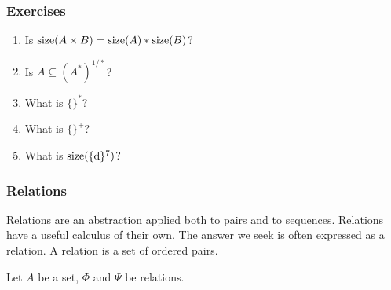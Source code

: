 \subsubsection{Exercises}

\begin{enumerate}\setcounter{enumi}{\value{RunningExercise}}

\item Is ${\rm size}(A \times B) = {\rm size}(A)*{\rm size}(B)$? 

\item Is $A \subseteq (A^*)^{1/*}$?

\item What is $\{\}^*$?

\item What is $\{\}^{\scriptscriptstyle +}$?

\item What is ${\rm size}(\{{\rm d}\}^7)$?

\setcounter{RunningExercise}{\value{enumi}}
\end{enumerate}

\subsubsection{Relations}

Relations are an abstraction applied both to pairs and to sequences.  
Relations have a useful calculus of their own.  
The answer we seek is often expressed as a relation.  
A relation is a set of ordered pairs.  

\setcounter{RelationDefinitions}{\value{table}}

Let $A$ be a set, $\Phi$ and $\Psi$ be relations.

